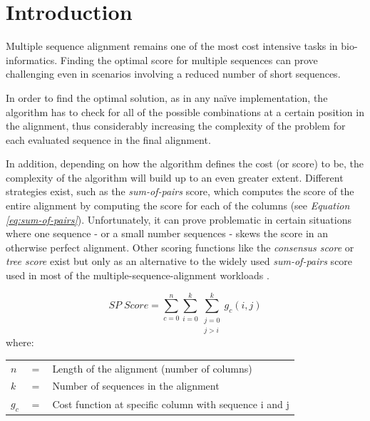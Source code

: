 \documentclass[twoside,openright,titlepage,numbers=noenddot,headinclude,%
                footinclude=true,cleardoublepage=empty,abstractoff, %
                BCOR=5mm,paper=a4,fontsize=11pt,%
                ngerman,american,%
                ]{scrreprt}
\makeatletter
\newenvironment{conditions}
  {\par\vspace{\abovedisplayskip}\noindent
   \begin{tabular}{>{$}l<{$} @{} >{${}}c<{{}$} @{} l}}
  {\end{tabular}\par\vspace{\belowdisplayskip}}
\makeatother
\begin{document}
\frenchspacing
\raggedbottom
{} %
\pagestyle{plain}



\pagestyle{scrheadings}
\cleardoublepage
\cleardoublepage{}
\cleardoublepage

\chapter{Introduction}
\label{cha:introduction}

\setlength{\parskip}{5pt plus2pt}

Multiple sequence alignment remains one of the most cost intensive tasks in bio-informatics. Finding the optimal score for multiple sequences can prove challenging even in scenarios involving a reduced number of short sequences.

In order to find the optimal solution, as in any naïve implementation, the algorithm has to check for all of the possible combinations at a certain position in the alignment, thus considerably increasing the complexity of the problem for each evaluated sequence in the final alignment.

In addition, depending on how the algorithm defines the cost (or score) to be, the complexity of the algorithm will build up to an even greater extent. Different strategies exist, such as the \textit{sum-of-pairs} score, which computes the score of the entire alignment by computing the score for each of the columns (see \textit{Equation \ref{eq:sum-of-pairs}}). Unfortunately, it can prove problematic in certain situations where one sequence - or a small number sequences - skews the score in an otherwise perfect alignment. Other scoring functions like the \textit{consensus score} or \textit{tree score} exist but only as an alternative to the widely used \textit{sum-of-pairs} score used in most of the multiple-sequence-alignment workloads \cite{fu-berlin}.

\begin{equation}\label{eq:sum-of-pairs}
    SP\;Score = \sum_{c = 0}^{n} \sum_{i = 0}^{k} \sum_{\substack{j = 0 \\ j > i}}^{k} g_{c}(i,j)
\end{equation}
where:
\begin{conditions}
 n     & =       &  Length of the alignment (number of columns) \\
 k & = & Number of sequences in the alignment \\ 
 g_{c} & = & Cost function at specific column with sequence i and j
\end{conditions}
\end{document}
